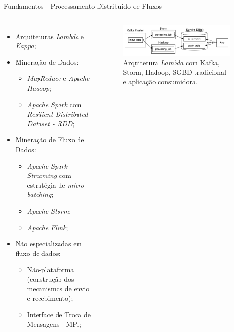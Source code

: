 \documentclass[aspectratio=1610,10pt]{beamer}
\begin{document}
\begin{frame}[fragile]{Fundamentos - Processamento Distribuído de Fluxos}
    \begin{columns}[T,onlytextwidth]
        \vspace{1em}
        \begin{itemize}%
          \item Arquiteturas \emph{Lambda} e \emph{Kappa};
          \item Mineração de Dados:
          \begin{itemize}
            \item \emph{MapReduce} e \emph{Apache Hadoop};
            \item \emph{Apache Spark} com \emph{Resilient Distributed Dataset - RDD};
          \end{itemize}
          \item Mineração de Fluxo de Dados:
          \begin{itemize}
            \item \emph{Apache Spark Streaming} com estratégia de \emph{micro-batching};
            \item \emph{Apache Storm};
            \item \emph{Apache Flink};
          \end{itemize}
          \item Não especializadas em fluxo de dados:
          \begin{itemize}
            \item Não-plataforma (construção dos mecanismos de envio e recebimento);
            \item Interface de Troca de Mensagens - MPI;
          \end{itemize}
        \end{itemize}
        \begin{figure}
          \includegraphics[width=\textwidth]{figuras/lambda.png}
          \caption{Arquitetura \emph{Lambda} com Kafka, Storm, Hadoop, SGBD tradicional e aplicação consumidora.}

\end{figure}
\end{columns}
\end{frame}
\end{document}
